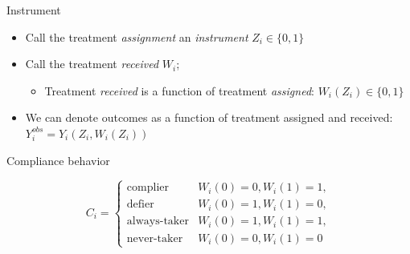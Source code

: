 \documentclass[xcolor={dvipsnames},handout]{beamer}
\begin{document}
\begin{frame}{Instrument}

\begin{itemize}
\item Call the treatment \textit{assignment} an \textit{instrument} $Z_i\in \{0,1 \}$
\item Call the treatment \textit{received} $W_i$;
\begin{itemize}
\item Treatment \textit{received} is a function of treatment \textit{assigned}: $W_i(Z_i)\in \{0,1 \}$
\end{itemize}
\item We can denote  outcomes as a function of treatment assigned and received: $Y_i^{obs} = Y_i(Z_i, W_i(Z_i))$
\end{itemize}

\end{frame}



\begin{frame}{Compliance behavior}

$$
C_i =
\begin{cases}
\text{complier} & W_i(0) = 0,  W_i(1) = 1, \\
\text{defier} & W_i(0) = 1,  W_i(1) = 0, \\
\text{always-taker} & W_i(0) = 1,  W_i(1) = 1, \\
\text{never-taker} & W_i(0) = 0,  W_i(1) = 0
\end{cases}
$$

\end{frame}
\end{document}
